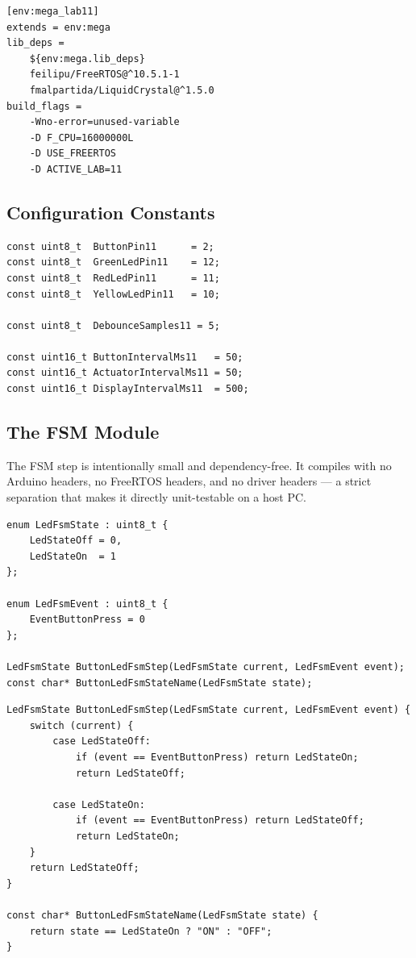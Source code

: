 \documentclass[12pt]{article}
\begin{document}
\begin{lstlisting}
[env:mega_lab11]
extends = env:mega
lib_deps =
    ${env:mega.lib_deps}
    feilipu/FreeRTOS@^10.5.1-1
    fmalpartida/LiquidCrystal@^1.5.0
build_flags =
    -Wno-error=unused-variable
    -D F_CPU=16000000L
    -D USE_FREERTOS
    -D ACTIVE_LAB=11
\end{lstlisting}

\subsection{Configuration Constants}

\begin{lstlisting}[caption={Lab11Config.h --- pins, intervals, debounce}]
const uint8_t  ButtonPin11      = 2;
const uint8_t  GreenLedPin11    = 12;
const uint8_t  RedLedPin11      = 11;
const uint8_t  YellowLedPin11   = 10;

const uint8_t  DebounceSamples11 = 5;

const uint16_t ButtonIntervalMs11   = 50;
const uint16_t ActuatorIntervalMs11 = 50;
const uint16_t DisplayIntervalMs11  = 500;
\end{lstlisting}

\subsection{The FSM Module}

The FSM step is intentionally small and dependency-free. It compiles with no Arduino headers, no FreeRTOS headers, and no driver headers --- a strict separation that makes it directly unit-testable on a host PC.

\begin{lstlisting}[caption={ButtonLedFsm.h --- pure FSM interface}]
enum LedFsmState : uint8_t {
    LedStateOff = 0,
    LedStateOn  = 1
};

enum LedFsmEvent : uint8_t {
    EventButtonPress = 0
};

LedFsmState ButtonLedFsmStep(LedFsmState current, LedFsmEvent event);
const char* ButtonLedFsmStateName(LedFsmState state);
\end{lstlisting}

\begin{lstlisting}[caption={ButtonLedFsm.cpp --- the transition function}]
LedFsmState ButtonLedFsmStep(LedFsmState current, LedFsmEvent event) {
    switch (current) {
        case LedStateOff:
            if (event == EventButtonPress) return LedStateOn;
            return LedStateOff;

        case LedStateOn:
            if (event == EventButtonPress) return LedStateOff;
            return LedStateOn;
    }
    return LedStateOff;
}

const char* ButtonLedFsmStateName(LedFsmState state) {
    return state == LedStateOn ? "ON" : "OFF";
}
\end{lstlisting}
\end{document}
